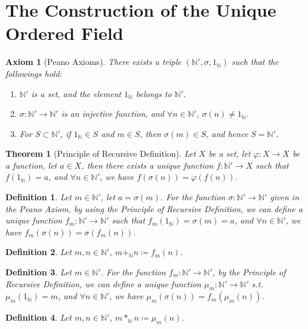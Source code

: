 \documentclass[11pt]{article}
\theoremstyle{break}
\theoremstyle{break}
\newtheorem{axiom}{Axiom}
\newtheorem{thm}{Theorem}[section]
\newtheorem{defn}{Definition}[corL]
\newcommand{\N}{\mathbb{N}}
\begin{document}
\section{\color{red} The Construction of the Unique Ordered Field}
	\begin{axiom}[Peano Axioms]
		There exists a triple $(\N',\sigma,1_{\N})$ such that the followings hold:
		\begin{enumerate}[topsep=3pt,itemsep=-1ex,partopsep=1ex,parsep=1ex]
		\item $\N'$ is a set, and the element $1_{\N}$ belongs to $\N'$.
		\item $\sigma: \N' \to \N'$ is an injective function, and $\forall n \in \N'$, $\sigma(n) \neq 1_{\N}$.
		\item For $S \subset \N'$, if $1_{\N} \in S$ and $m \in S$, then $\sigma(m) \in S$, and hence $S = \N'$.
		\end{enumerate}
	\end{axiom}
	
	\begin{thm}[Principle of Recursive Definition]
		Let $X$ be a set, let $\varphi:X \to X$ be a function, let $a \in X$, then there exists a unique function $f:\N' \to X$ such that $f(1_\N)=a$, and $\forall n \in \N'$, we have $f(\sigma(n))=\varphi(f(n))$.
	\end{thm}
		
	\begin{defn}
		Let $m \in \N'$, let $a = \sigma(m)$. For the function $\sigma: \N' \to \N'$ given in the Peano Axiom, by using the Principle of Recursive Definition, we can define a unique function $f_m: \N' \to \N'$ such that $f_m(1_{\N})=\sigma(m)=a$, and $\forall n \in \N'$, we have $f_m(\sigma(n))=\sigma(f_m(n))$.
	\end{defn}
	
	\begin{defn}
		Let $m,n \in \N'$, $m +_{\N} n \coloneqq f_m(n)$.
	\end{defn}
	
	\begin{defn}
		Let $m \in \N'$. For the function $f_m:\N' \to \N'$, by the Principle of Recursive Definition, we can define a unique function $\mu_m :\N' \to \N'$ s.t. $\mu_m (1_\N)=m$, and $\forall n \in \N'$, we have $\mu_m(\sigma(n))=f_m(\mu_m(n))$.
	\end{defn}
	
	\begin{defn}
		Let $m,n \in \N'$, $m \ast_{\N} n \coloneqq \mu_m(n)$.
	\end{defn}
	
\end{document}
